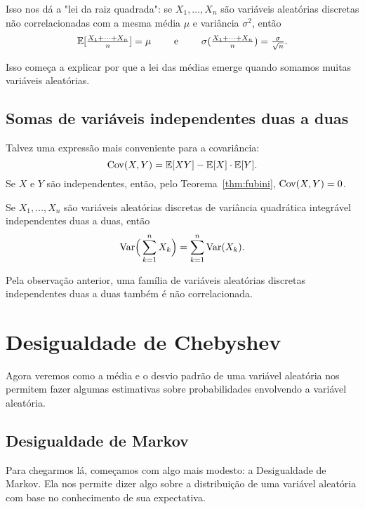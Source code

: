 Isso nos dá a "lei da raiz quadrada": se $ X_1, \dots, X_n $ são variáveis aleatórias discretas não correlacionadas com a mesma média $ \mu $ e variância $ \sigma^2 $, então
\[
\mathbb{E}[\tfrac{X_1 + \dots + X_n}{n} ] = \mu
\qquad
\text{ e }
\qquad
\sigma(\tfrac{X_1 + \dots + X_n}{n}) = \tfrac{\sigma}{\sqrt{n}}
.
\]

Isso começa a explicar por que a lei das médias emerge quando somamos muitas variáveis aleatórias.

\subsection{Somas de variáveis independentes duas a duas}

Talvez uma expressão mais conveniente para a covariância:
\[
\mathrm{Cov}(X, Y) = \mathbb{E}[XY] - \mathbb{E}[X] \cdot \mathbb{E}[Y]
.
\]
Se $X$ e $Y$ são independentes, então, pelo Teorema~\ref{thm:fubini}, $ \mathrm{Cov}(X, Y) = 0 $.

\begin{corollary}
\label{cor:varsumind}
Se $X_1, \dots, X_n $ são variáveis aleatórias discretas de variância quadrática integrável independentes duas a duas, então
\[
\mathrm{Var}\Big(\sum_{k=1}^n X_k\Big)
=
\sum_{k=1}^n \mathrm{Var}(X_k)
.
\]
\end{corollary}

Pela observação anterior, uma família de variáveis aleatórias discretas independentes duas a duas também é não correlacionada.


\clearpage
\section{Desigualdade de Chebyshev}

Agora veremos como a média e o desvio padrão de uma variável aleatória nos permitem fazer algumas estimativas sobre probabilidades envolvendo a variável aleatória.

\subsection{Desigualdade de Markov}

Para chegarmos lá, começamos com algo mais modesto: a Desigualdade de Markov.
Ela nos permite dizer algo sobre a distribuição de uma variável aleatória com base no conhecimento de sua expectativa.

